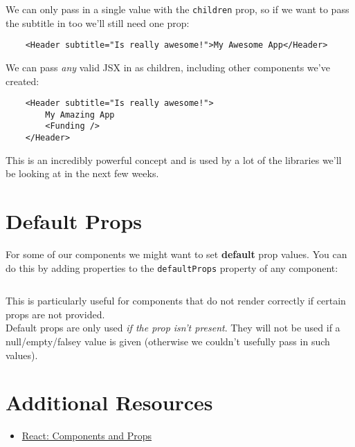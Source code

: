 We can only pass in a single value with the \texttt{children} prop, so if we want to pass the subtitle in too we'll still need one prop:

\begin{verbatim}
    <Header subtitle="Is really awesome!">My Awesome App</Header>
\end{verbatim}

We can pass \textit{any} valid JSX in as children, including other components we've created:

\begin{verbatim}
    <Header subtitle="Is really awesome!">
        My Amazing App
        <Funding />
    </Header>
\end{verbatim}

This is an incredibly powerful concept and is used by a lot of the libraries we'll be looking at in the next few weeks.


\pagebreak


\section{Default Props}


For some of our components we might want to set \textbf{default} prop values. You can do this by adding properties to the \texttt{defaultProps} property of any component:

\inputminted{jsx}{01/figures/03/09-default-props.jsx}

This is particularly useful for components that do not render correctly if certain props are not provided.
\\

Default props are only used \textit{if the prop isn't present}. They will not be used if a null/empty/falsey value is given (otherwise we couldn't usefully pass in such values).


\section{Additional Resources}

\begin{itemize}[leftmargin=*]
    \item \href{https://reactjs.org/docs/components-and-props.html}{React: Components and Props}
\end{itemize}
